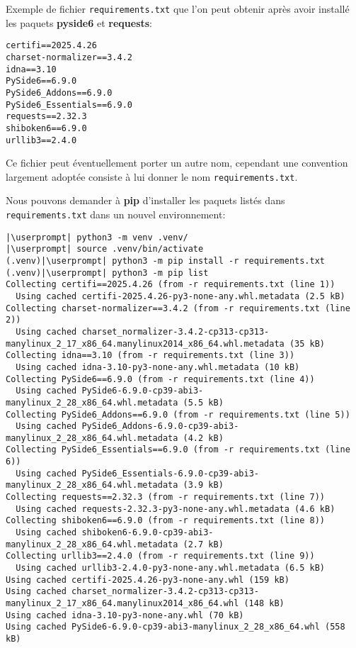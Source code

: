 Exemple de fichier \texttt{requirements.txt} que l'on peut obtenir après avoir installé les paquets \textbf{pyside6} et \textbf{requests}:
\begin{lstlisting}[style=file]
certifi==2025.4.26
charset-normalizer==3.4.2
idna==3.10
PySide6==6.9.0
PySide6_Addons==6.9.0
PySide6_Essentials==6.9.0
requests==2.32.3
shiboken6==6.9.0
urllib3==2.4.0
\end{lstlisting}

Ce fichier peut éventuellement porter un autre nom, cependant une convention largement adoptée consiste à lui donner le nom \texttt{requirements.txt}.

Nous pouvons demander à \textbf{pip} d’installer les paquets listés dans \texttt{requirements.txt} dans un nouvel environnement:
\begin{lstlisting}[style=bash]
|\userprompt| python3 -m venv .venv/
|\userprompt| source .venv/bin/activate
(.venv)|\userprompt| python3 -m pip install -r requirements.txt
(.venv)|\userprompt| python3 -m pip list
Collecting certifi==2025.4.26 (from -r requirements.txt (line 1))
  Using cached certifi-2025.4.26-py3-none-any.whl.metadata (2.5 kB)
Collecting charset-normalizer==3.4.2 (from -r requirements.txt (line 2))
  Using cached charset_normalizer-3.4.2-cp313-cp313-manylinux_2_17_x86_64.manylinux2014_x86_64.whl.metadata (35 kB)
Collecting idna==3.10 (from -r requirements.txt (line 3))
  Using cached idna-3.10-py3-none-any.whl.metadata (10 kB)
Collecting PySide6==6.9.0 (from -r requirements.txt (line 4))
  Using cached PySide6-6.9.0-cp39-abi3-manylinux_2_28_x86_64.whl.metadata (5.5 kB)
Collecting PySide6_Addons==6.9.0 (from -r requirements.txt (line 5))
  Using cached PySide6_Addons-6.9.0-cp39-abi3-manylinux_2_28_x86_64.whl.metadata (4.2 kB)
Collecting PySide6_Essentials==6.9.0 (from -r requirements.txt (line 6))
  Using cached PySide6_Essentials-6.9.0-cp39-abi3-manylinux_2_28_x86_64.whl.metadata (3.9 kB)
Collecting requests==2.32.3 (from -r requirements.txt (line 7))
  Using cached requests-2.32.3-py3-none-any.whl.metadata (4.6 kB)
Collecting shiboken6==6.9.0 (from -r requirements.txt (line 8))
  Using cached shiboken6-6.9.0-cp39-abi3-manylinux_2_28_x86_64.whl.metadata (2.7 kB)
Collecting urllib3==2.4.0 (from -r requirements.txt (line 9))
  Using cached urllib3-2.4.0-py3-none-any.whl.metadata (6.5 kB)
Using cached certifi-2025.4.26-py3-none-any.whl (159 kB)
Using cached charset_normalizer-3.4.2-cp313-cp313-manylinux_2_17_x86_64.manylinux2014_x86_64.whl (148 kB)
Using cached idna-3.10-py3-none-any.whl (70 kB)
Using cached PySide6-6.9.0-cp39-abi3-manylinux_2_28_x86_64.whl (558 kB)

\end{lstlisting}
